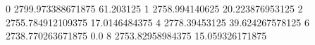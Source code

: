 0 2799.973388671875 61.203125
1 2758.994140625 20.223876953125
2 2755.784912109375 17.0146484375
4 2778.39453125 39.624267578125
6 2738.770263671875 0.0
8 2753.82958984375 15.059326171875
